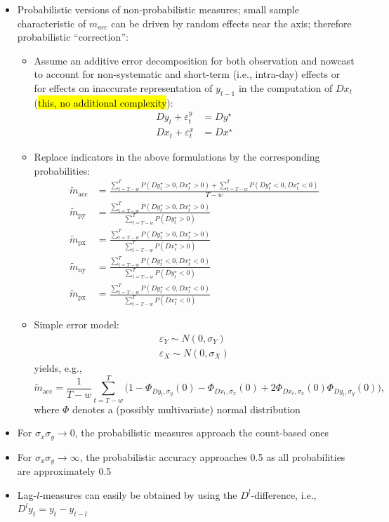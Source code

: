 \documentclass[oneside]{article}
\theoremstyle{plain}%
\theoremstyle{definition}
\newcommand{\ydiff}{D y}
\newcommand{\ydifft}{Dy^\star}
\newcommand{\xdiff}{Dx}
\newcommand{\xdifft}{Dx^\star}
\newcommand{\Prob}[1]{P(#1)}
\newcommand{\mprob}{\tilde{m}}
\begin{document}
\begin{itemize}
\item Probabilistic versions of non-probabilistic measures; small sample characteristic of $m_{acc}$ can be driven by random effects near the axis; therefore probabilistic \enquote{correction}:
\begin{itemize}
  \item Assume an additive error decomposition for both observation and nowcast to account for non-systematic and short-term (i.e., intra-day) effects or for effects on inaccurate representation of $y_{t-1}$ in the computation of $Dx_t$ (\hl{this, no additional complexity}):
  	\begin{align}\label{additive error decomposition}
  		\ydiff_t + \varepsilon_t^y &= \ydifft  \\
  		\xdiff_t + \varepsilon_t^x &= \xdifft 
	\end{align}
\item  Replace indicators in the above formulations by the corresponding probabilities:
\begin{align}
		\mprob_{\text{acc}} &= \frac{\sum_{t=T-w}^T \Prob{ \ydifft_t > 0, \xdifft_t > 0} + \sum_{t=T-w}^T \Prob{\ydifft_t < 0, \xdifft_t < 0}}{T-w}  \\
   \mprob_{\text{py}} &= \frac{\sum_{t=T-w}^T \Prob{\ydifft_t > 0, \xdifft_t > 0}}{\sum_{t=T-w}^T \Prob{\ydifft_t > 0}} \\
    \mprob_{\text{px}} &= \frac{\sum_{t=T-w}^T \Prob{\ydifft_t > 0, \xdifft_t > 0}}{\sum_{t=T-w}^T \Prob{\xdifft_t > 0}} \\
    \mprob_{\text{ny}} &= \frac{\sum_{t=T-w}^T \Prob{\ydifft_t < 0, \xdifft_t < 0}}{\sum_{t=T-w}^T \Prob{\ydifft_t < 0}} \\
    \mprob_{\text{px}} &= \frac{\sum_{t=T-w}^T \Prob{\ydifft_t < 0, \xdifft_t < 0}}{\sum_{t=T-w}^T \Prob{\xdifft_t < 0}} 
\end{align} 
\item Simple error model:
  \begin{align}
	  \varepsilon_Y \sim N(0, \sigma_Y) \\
	  \varepsilon_X \sim N(0, \sigma_X)
  \end{align}
  yields, e.g.,
  	\begin{equation}
  		\mprob_{\text{acc}} = \frac{1}{T-w} \sum_{t=T-w}^T  \big( 1 - \Phi_{\ydiff_t, \sigma_y}(0) - \Phi_{\xdiff_t, \sigma_x} (0) + 2 \Phi_{\xdiff_t,\sigma_x}( 0)\Phi_{\ydiff_t,\sigma_y}( 0) \big), 
	\end{equation}
	where $\Phi$ denotes a (possibly multivariate) normal distribution
\end{itemize}
\item For $\sigma_x \sigma_y \rightarrow 0$, the probabilistic measures approach the count-based ones
\item For $\sigma_x \sigma_y \rightarrow \infty$, the probabilistic accuracy approaches   0.5 as all probabilities are approximately 0.5
\item Lag-$l$-measures can easily be obtained by using the $D^l$-difference, i.e., $D^l y_t = y_t - y_{t-l}$
\end{itemize}
\end{document}
